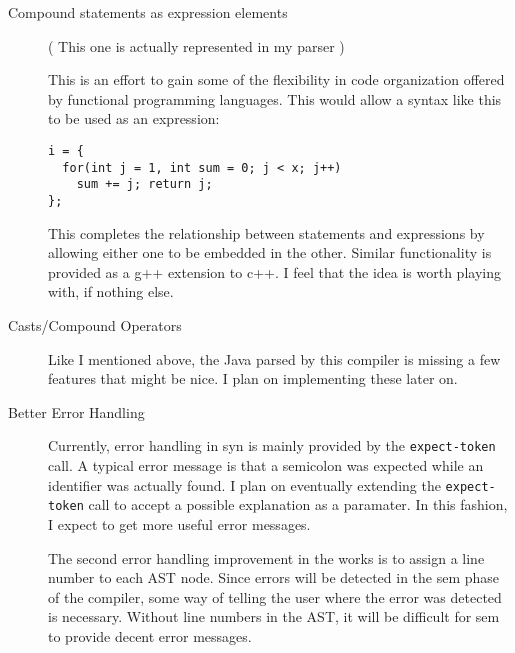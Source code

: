 \documentclass{article}[1994/05/24]
\begin{document}
\begin{description}

\item[Compound statements as expression elements]

( This one is actually represented in my parser )

	This is an effort to gain some of the flexibility in
code organization offered by functional programming languages. This
would allow a syntax like this to be used as an expression:

\begin{verbatim}
i = { 
  for(int j = 1, int sum = 0; j < x; j++)
    sum += j; return j;
};
\end{verbatim}

	This completes the relationship between statements and expressions
by allowing either one to be embedded in the other. Similar functionality
is provided as a g++ extension to c++. I feel that the idea is worth playing
with, if nothing else.

\item[Casts/Compound Operators]

	Like I mentioned above, the Java parsed by this compiler is missing
a few features that might be nice.  I plan on implementing these later on.

\item[Better Error Handling]

	Currently, error handling in syn is mainly provided by the
\verb|expect-token| call. A typical error message is that a semicolon
was expected while an identifier was actually found.  I plan on eventually
extending the \verb|expect-token| call to accept a possible explanation
as a paramater.  In this fashion, I expect to get more useful error
messages.

	The second error handling improvement in the works is to assign
a line number to each AST node.  Since errors will be detected in the
sem phase of the compiler, some way of telling the user where the error
was detected is necessary.  Without line numbers in the AST, it will be
difficult for sem to provide decent error messages.

\end{description}


\end{document}
